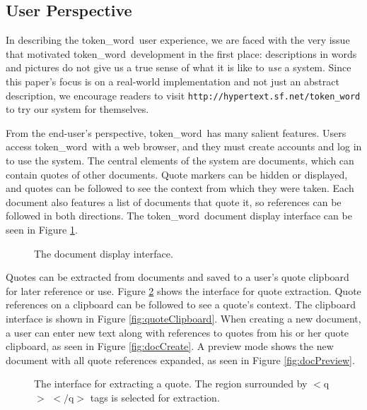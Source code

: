 \documentclass{acm_proc_article-sp}
\newcommand{\tw}{token\_word}
\begin{document}
\subsection{User Perspective}
In describing the \tw \  user experience, we are faced with the very issue that motivated \tw \  development in the first place:  descriptions in words and pictures do not give us a true sense of what it is like to {\it use} a system.
Since this paper's focus is on a real-world implementation and not just an abstract description, we encourage readers to visit {\tt http://hypertext.sf.net/token\_word} to try our system for themselves. 

From the end-user's perspective, \tw \  has many sal\-ient features.
Users access \tw \  with a web browser, and they must create accounts and log in to use the system.  
The central elements of the system are documents, which can contain quotes of other documents.
Quote markers can be hidden or displayed, and quotes can be followed to see the context from which they were taken.
Each document also features a list of documents that quote it, so references can be followed in both directions.
The \tw \   document display interface can be seen in Figure \ref{fig:mainScreen}.

\begin{figure}[t]
\centering
{}
\caption{The document display interface.}
\label{fig:mainScreen}
\end{figure}  

Quotes can be extracted from documents and saved to a user's quote clipboard for later reference or use.
Figure \ref{fig:extractQuote} shows the interface for quote extraction. 
Quote references on a clipboard can be followed to see a quote's context.
The clipboard interface is shown in Figure \ref{fig:quoteClipboard}.
When creating a new document, a user can enter new text along with references to quotes from his or her quote clipboard, as seen in Figure \ref{fig:docCreate}.
A preview mode shows the new document with all quote references expanded, as seen in Figure \ref{fig:docPreview}.

\begin{figure}[t]
\centering
{}
\caption{The interface for extracting a quote.  The region surrounded by $<$q$>$ $<$$/$q$>$ tags is selected for extraction.}
\label{fig:extractQuote}
\end{figure}
\end{document}
